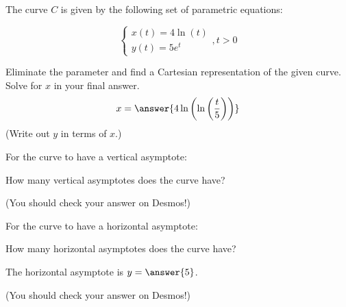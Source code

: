 \documentclass{ximera}
\author{Jim Talamo}
\begin{document}
\begin{exercise}

The curve $C$ is given by the following set of parametric equations:

\[ \begin{cases}
x(t)=   4 \ln (t) \\
y(t)=   5 e^t\end{cases}
, t>0 \]

Eliminate the parameter and find a Cartesian representation of the given curve.  Solve for $x$ in your final answer.
\[
x= \answer{ 4\ln\left(\ln\left(\frac{t}{5} \right)\right)}
\]
(Write out $y$ in terms of $x$.)

\begin{exercise}
For the curve to have a vertical asymptote:

\begin{multipleChoice}
\end{multipleChoice}

How many vertical asymptotes does the curve have?

\begin{multipleChoice}
\end{multipleChoice} 

(You should check your answer on Desmos!)
\end{exercise}


\begin{exercise}
For the curve to have a horizontal asymptote:

\begin{multipleChoice}
\end{multipleChoice}

How many horizontal asymptotes does the curve have?

\begin{multipleChoice}
\end{multipleChoice} 

The horizontal asymptote is $y=\answer{5}$.

(You should check your answer on Desmos!)
\end{exercise}
\end{exercise}
\end{document}
